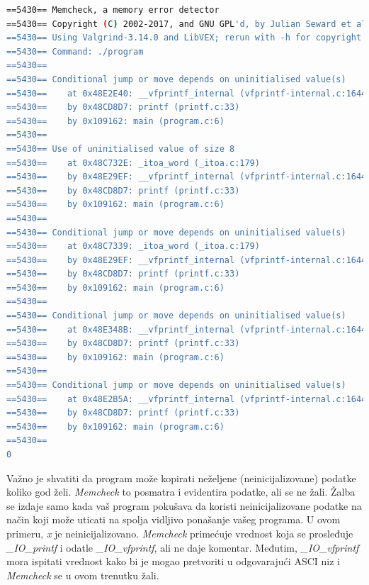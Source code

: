 \documentclass[12pt,oneside]{memoir}
\theoremstyle{plain}
\theoremstyle{definition}
\begin{document}


\begin{lstlisting}[style=terminal,caption={Primer ispisa greške korišćenja neinicijalizovanih vrednosti}, label={lst:slika2.5},language={bash}] 
==5430== Memcheck, a memory error detector
==5430== Copyright (C) 2002-2017, and GNU GPL'd, by Julian Seward et al. 
==5430== Using Valgrind-3.14.0 and LibVEX; rerun with -h for copyright info 
==5430== Command: ./program
==5430==
==5430== Conditional jump or move depends on uninitialised value(s)
==5430==	at 0x48E2E40: __vfprintf_internal (vfprintf-internal.c:1644)
==5430==	by 0x48CD8D7: printf (printf.c:33)
==5430==	by 0x109162: main (program.c:6)
==5430==
==5430== Use of uninitialised value of size 8
==5430==	at 0x48C732E: _itoa_word (_itoa.c:179)
==5430==	by 0x48E29EF: __vfprintf_internal (vfprintf-internal.c:1644)
==5430==	by 0x48CD8D7: printf (printf.c:33)
==5430==	by 0x109162: main (program.c:6)
==5430==
==5430== Conditional jump or move depends on uninitialised value(s)
==5430==	at 0x48C7339: _itoa_word (_itoa.c:179)
==5430==	by 0x48E29EF: __vfprintf_internal (vfprintf-internal.c:1644)
==5430==	by 0x48CD8D7: printf (printf.c:33)
==5430==	by 0x109162: main (program.c:6)
==5430==
==5430== Conditional jump or move depends on uninitialised value(s)
==5430==	at 0x48E348B: __vfprintf_internal (vfprintf-internal.c:1644)
==5430==	by 0x48CD8D7: printf (printf.c:33)
==5430==	by 0x109162: main (program.c:6)
==5430==
==5430== Conditional jump or move depends on uninitialised value(s)
==5430==	at 0x48E2B5A: __vfprintf_internal (vfprintf-internal.c:1644)
==5430==	by 0x48CD8D7: printf (printf.c:33)
==5430==	by 0x109162: main (program.c:6)
==5430==
0
\end{lstlisting}

Važno je shvatiti da program može kopirati neželjene (neinicijalizovane) podatke koliko god želi. \textit{Memcheck} to posmatra i evidentira podatke, ali se ne žali. Žalba se izdaje samo kada vaš program pokušava da koristi neinicijalizovane podatke na način koji može uticati na spolja vidljivo ponašanje vašeg programa. U ovom primeru, \textit{x} je neinicijalizovano. \textit{Memcheck} primećuje vrednost koja se prosleđuje \textit{\_IO\_printf} i odatle \textit{\_IO\_vfprintf}, ali ne daje komentar. Međutim, \textit{\_IO\_vfprintf} mora ispitati vrednost  kako bi je mogao pretvoriti u odgovarajući ASCI niz i \textit{Memcheck} se u ovom trenutku žali.
\end{document}
